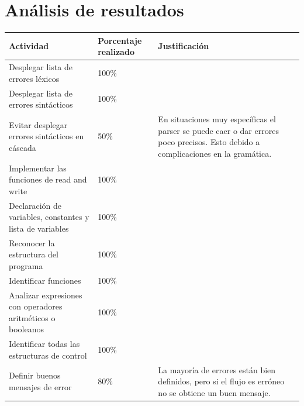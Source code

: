 \documentclass[a4paper,12pt]{article}
\begin{document}
\section*{Análisis de resultados}
\begin{table}[!ht]
    \centering
    \begin{tabularx}{\textwidth}{|X|X|X|}
        \hline
        Actividad & Porcentaje realizado & Justificación \\ 
        \hline
        Desplegar lista de errores léxicos & 100\% & \\
        \hline
        Desplegar lista de errores sintácticos & 100\% & \\
        \hline
        Evitar desplegar errores sintácticos en cáscada & 50\% & En situaciones muy específicas el parser se puede caer o dar errores poco precisos. Esto debido a complicaciones en la gramática. \\
        \hline
        Implementar las funciones de read and write & 100\% & \\
        \hline
        Declaración de variables, constantes y lista de variables & 100\% & \\
        \hline
        Reconocer la estructura del programa & 100\% & \\
        \hline
        Identificar funciones & 100\% & \\
        \hline
        Analizar expresiones con operadores aritméticos o booleanos & 100\% & \\
        \hline
        Identificar todas las estructuras de control & 100\% & \\
        \hline
        Definir buenos mensajes de error & 80\% & La mayoría de errores están bien definidos, pero si el flujo es erróneo no se obtiene un buen mensaje. \\
        \hline
    \end{tabularx}
\end{table}

\end{document}
